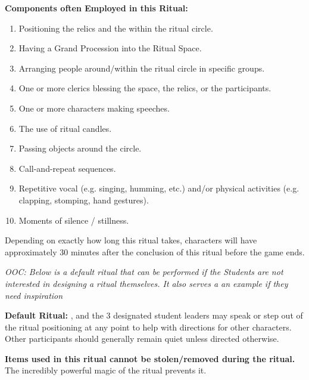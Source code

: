\documentclass[green]{GL2020}
\begin{document}
\textbf{Components often Employed in this Ritual:}
\begin{enumerate}
  \item Positioning the relics and the \sStormSeed{} within the ritual circle.
  \item Having a Grand Procession into the Ritual Space.
  \item Arranging people around/within the ritual circle in specific groups.
  \item One or more clerics blessing the space, the relics, or the participants.
  \item One or more characters making speeches.
  \item The use of ritual candles.
  \item Passing objects around the circle.
  \item Call-and-repeat sequences.
  \item Repetitive vocal (e.g. singing, humming, etc.) and/or physical activities (e.g. clapping, stomping, hand gestures).
  \item Moments of silence / stillness.
\end{enumerate}

Depending on exactly how long this ritual takes, characters will have approximately 30 minutes after the conclusion of this ritual before the game ends.

\emph{OOC: Below is a default ritual that can be performed if the Students are not interested in designing a ritual themselves. It also serves a an example if they need inspiration}

\textbf{Default Ritual:}
\cPrincipal{}, \cChupSecond{} and the 3 designated student leaders may speak or step out of the ritual positioning at any point to help with directions for other characters. Other participants should generally remain quiet unless directed otherwise.

\textbf{Items used in this ritual cannot be stolen/removed during the ritual.} The incredibly powerful magic of the ritual prevents it.
\end{document}
